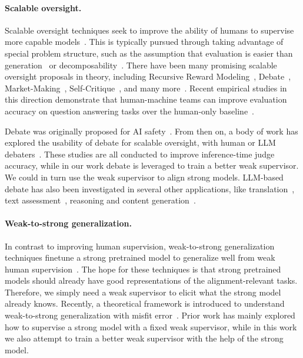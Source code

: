 \documentclass[letterpaper]{article} %
\begin{document}
\paragraph{Scalable oversight.} Scalable oversight techniques seek to improve the ability of humans to supervise more capable models~\cite{bowman2022measuring}.
This is typically pursued through taking advantage of special problem structure, such as the assumption that evaluation is easier than generation~\cite{karp1975computational,goodfellow2014generative} or decomposability~\cite{christiano2018supervising}.
There have been many promising scalable oversight proposals in theory, including Recursive Reward Modeling~\cite{leike2018scalable}, Debate~\cite{irving2018ai}, Market-Making~\cite{Hubinger2020market}, Self-Critique~\cite{saunders2022self}, and many more~\cite{lightman2023let,mcaleese2024llm,sun2024easy}.
Recent empirical studies in this direction demonstrate that human-machine teams can improve evaluation accuracy on question answering tasks over the human-only baseline~\cite{bowman2022measuring}.

Debate was originally proposed for AI safety~\cite{irving2018ai}.
From then on, a body of work has explored the usability of debate for scalable oversight, with human or LLM debaters~\cite{parrish2022single,parrish2022two,michael2023debate,khan2024debating,kenton2024scalable}.
These studies are all conducted to improve inference-time judge accuracy, while in our work debate is leveraged to train a better weak supervisor.
We could in turn use the weak supervisor to align strong models.
LLM-based debate has also been investigated in several other applications, like translation~\cite{liang2023encouraging}, text assessment~\cite{chan2023chateval}, reasoning and content generation~\cite{du2023improving}. 

\paragraph{Weak-to-strong generalization.} In contrast to improving human supervision, weak-to-strong generalization techniques finetune a strong pretrained model to generalize well from weak human supervision~\cite{burns2023weak}.
The hope for these techniques is that strong pretrained models should already have good representations of the alignment-relevant tasks.
Therefore, we simply need a weak supervisor to elicit what the strong model already knows.
Recently, a theoretical framework is introduced to understand weak-to-strong generalization with misfit error~\cite{charikar2024quantifying}.
Prior work has mainly explored how to supervise a strong model with a fixed weak supervisor, while in this work we also attempt to train a better weak supervisor with the help of the strong model.
\end{document}
